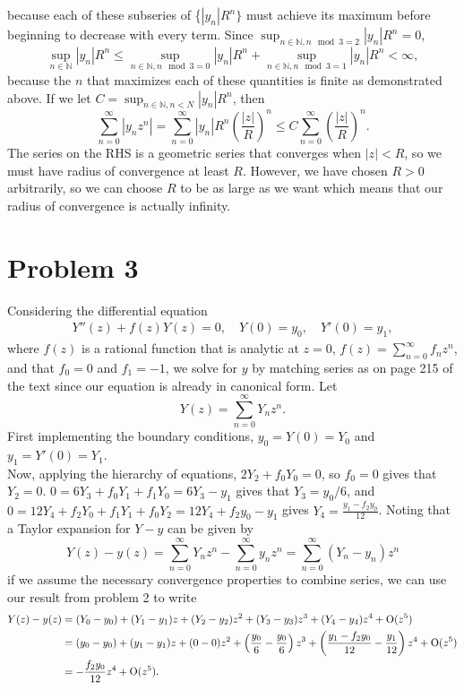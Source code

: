 \documentclass{article}
\begin{document}
because each of these subseries of \{$|y_n|R^n\}$ must achieve its maximum before beginning to decrease with every term. Since $\sup_{n\in\mathbb{N},n\mod3=2}|y_n|R^n=0$, %
\[
\sup_{n\in\mathbb{N}}|y_n|R^n\leq\sup_{n\in\mathbb{N},n\mod3=0}|y_n|R^n+\sup_{n\in\mathbb{N},n\mod3=1}|y_n|R^n<\infty,
\]
because the $n$ that maximizes each of these quantities  is finite as demonstrated above. If we let $C=\sup_{n\in\mathbb{N},n<N}|y_n|R^n$, then
\[
\sum_{n=0}^\infty |y_nz^n|=\sum_{n=0}^\infty |y_n|R^n\left(\frac{|z|}{R}\right)^n\leq C\sum_{n=0}^\infty\left(\frac{|z|}{R}\right)^n.
\]
The series on the RHS is a geometric series that converges when $|z|<R$, so we must have radius of convergence at least $R$. However, we have chosen $R>0$ arbitrarily, so we can choose $R$ to be as large as we want which means that our radius of convergence is actually infinity.

\section{Problem 3}
Considering the differential equation
  \begin{align*}
    Y''(z) + f(z) Y(z) = 0, \quad Y(0) = y_0, \quad Y'(0) = y_1,
  \end{align*}
where $f(z)$ is a rational function that is analytic at $z = 0$, $f(z)= \sum_{n=0}^\infty f_n z^n$, and that $f_0 = 0$ and $f_{1} = -1$, we solve for $y$ by matching series as on page 215 of the text since our equation is already in canonical form. Let
\[
Y(z)=\sum_{n=0}^{\infty}Y_nz^n.
\]
First implementing the boundary conditions, $y_0=Y(0)=Y_0$ and $y_1=Y'(0)=Y_1$.
\\
Now, applying the hierarchy of equations, $2Y_2+f_0Y_0=0$, so $f_0=0$ gives that $Y_2=0$. $0=6Y_3+f_0Y_1+f_1Y_0=6Y_3-y_1$ gives that $Y_3=y_0/6$, and $0=12Y_4+f_2Y_0+f_1Y_1+f_0Y_2=12Y_4+f_2y_0-y_1$ gives $Y_4=\frac{y_1-f_2y_0}{12}$. Noting that a Taylor expansion for $Y-y$ can be given by 
\[
Y(z)-y(z)=\sum_{n=0}^{\infty}Y_nz^n-\sum_{n=0}^{\infty}y_nz^n=\sum_{n=0}^{\infty}(Y_n-y_n)z^n
\]
if we assume the necessary convergence properties to combine series, we can use our result from problem 2 to write
\begin{align*}
Y(z)-y(z)&=(Y_0-y_0)+(Y_1-y_1)z+(Y_2-y_2)z^2+(Y_3-y_3)z^3+(Y_4-y_4)z^4+\operatorname{O}(z^5)\\&=
(y_0-y_0)+(y_1-y_1)z+(0-0)z^2+\left(\frac{y_0}{6}-\frac{y_0}{6}\right)z^3+\left(\frac{y_1-f_2y_0}{12}-\frac{y_1}{12}\right)z^4+\operatorname{O}(z^5)\\&=
-\frac{f_2y_0}{12}z^4+\operatorname{O}(z^5).
\end{align*}
\end{document}
